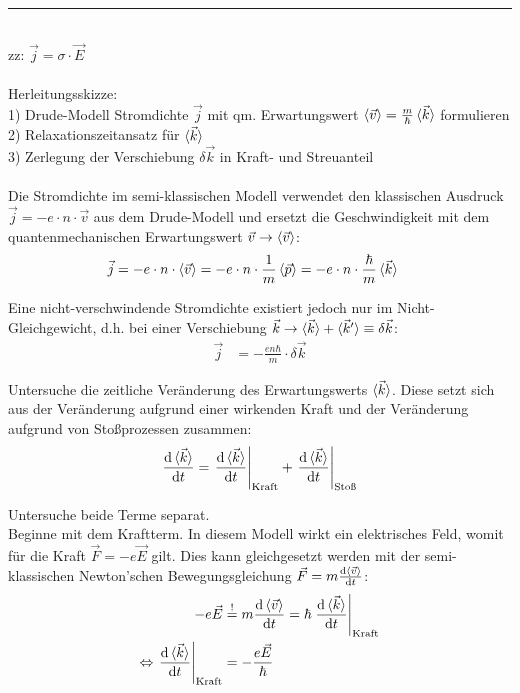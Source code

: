 \documentclass{article}
\newcommand{\diff}{\mathrm{d}}
\begin{document}
{\color{violet}
\hrule
	\\
	zz: $\vec{j} = \sigma \cdot \vec{E}$ \\
	\\
	Herleitungsskizze:\\
	1) Drude-Modell Stromdichte $\vec{j}$ mit qm. Erwartungswert $\braket{\vec{v}} = \frac{m}{\hbar}\braket{\vec{k}}$ formulieren \\
	2) Relaxationszeitansatz für $\braket{\vec{k}}$ \\
	3) Zerlegung der Verschiebung $\delta \vec{k}$ in Kraft- und Streuanteil \\
	\\
	Die Stromdichte im semi-klassischen Modell verwendet den klassischen Ausdruck $\vec{j} = -e \cdot n \cdot \vec{v}$ aus dem Drude-Modell und ersetzt die Geschwindigkeit mit dem quantenmechanischen Erwartungswert $\vec{v} \to \braket{\vec{v}}$:
		\begin{align*}
			\vec{j} &= -e \cdot n \cdot \braket{\vec{v}} = -e \cdot n \cdot \frac{1}{m} \braket{\vec{p}} = -e \cdot n \cdot \frac{\hbar}{m} \braket{\vec{k}}
		\end{align*}
	
	Eine nicht-verschwindende Stromdichte existiert jedoch nur im Nicht-Gleichgewicht, d.h. bei einer Verschiebung $\vec{k} \to \braket{\vec{k}} + \braket{\vec{k}'} \equiv \delta\vec{k}$:
		\begin{align*}
			\vec{j} &= -\frac{en\hbar}{m} \cdot \delta\vec{k}
		\end{align*}
	
	Untersuche die zeitliche Veränderung des Erwartungswerts $\braket{\vec{k}}$. Diese setzt sich aus der Veränderung aufgrund einer wirkenden Kraft und der Veränderung aufgrund von Stoßprozessen zusammen:
		\begin{align*}
			\frac{\diff \braket{\vec{k}}}{\diff t} = \left. \frac{\diff \braket{\vec{k}}}{\diff t} \right|_\text{Kraft} + \left. \frac{\diff \braket{\vec{k}}}{\diff t} \right|_\text{Stoß}
		\end{align*}
	
	Untersuche beide Terme separat.\\
	Beginne mit dem Kraftterm. In diesem Modell wirkt ein elektrisches Feld, womit für die Kraft $\vec{F} = -e\vec{E}$ gilt. Dies kann gleichgesetzt werden mit der semi-klassischen Newton'schen Bewegungsgleichung $\vec{F} = m \frac{\diff \braket{\vec{v}}}{\diff t}$:
		\begin{align*}
			-e\vec{E} &\stackrel{!}{=} m \frac{\diff \braket{\vec{v}}}{\diff t} = \hbar \left. \frac{\diff \braket{\vec{k}}}{\diff t} \right|_\text{Kraft} \\
			\Leftrightarrow \left. \frac{\diff \braket{\vec{k}}}{\diff t} \right|_\text{Kraft} &= -\frac{e\vec{E}}{\hbar}
		\end{align*}
	
}
\end{document}
